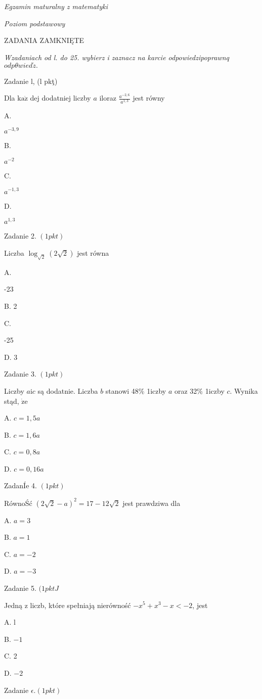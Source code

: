 \documentclass[a4paper,12pt]{article}
\begin{document}
{\it Egzamin maturalny z matematyki}

{\it Poziom podstawowy}

ZADANIA ZAMKNIĘTE

{\it Wzadaniach od l. do 25. wybierz i zaznacz na karcie odpowiedzipoprawnq} $odp\theta wied\acute{z}.$

Zadanie l, (l pkţ)

Dla $\mathrm{k}\mathrm{a}\dot{\mathrm{z}}$ dej dodatniej liczby $a$ iloraz $\displaystyle \frac{a^{-2,6}}{a^{1,3}}$ jest równy

A.

$a^{-3,9}$

B.

$a^{-2}$

C.

$a^{-1,3}$

D.

$a^{1,3}$

Zadanie 2. $(1pkt)$

Liczba $\log_{\sqrt{2}}(2\sqrt{2})$ jest równa

A.

-23

B. 2

C.

-25

D. 3

Zadanie 3. $(1pkt)$

Liczby $a\mathrm{i}c$ są dodatnie. Liczba $b$ stanowi 48\% 1iczby $a$ oraz 32\% 1iczby $c$. Wynika stąd, $\dot{\mathrm{z}}\mathrm{e}$

A. $c=1,5a$

B. $c=1,6a$

C. $c=0,8a$

D. $c=0,16a$

ZadanÍe 4. $(1pkt)$

RównoŚć $(2\sqrt{2}-a)^{2}=17-12\sqrt{2}$ jest prawdziwa dla

A. $a=3$

B. $a=1$

C. $a=-2$

D. $a=-3$

Zadanie 5. $(1pktJ$

Jedną z liczb, które spełniają nierówność $-x^{5}+x^{3}-x<-2$, jest

A. l

B. $-1$

C. 2

D. $-2$

Zadanie $\epsilon. (1pkt)$
\end{document}
